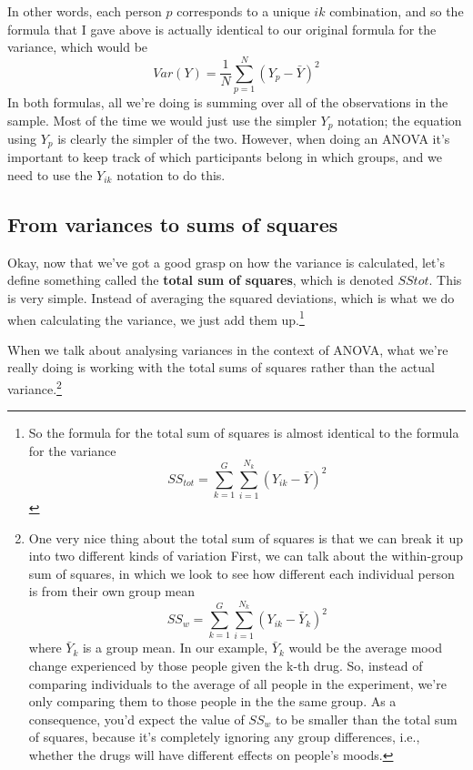 \documentclass[
  a4paper,
]{book}
\begin{document}
In other words, each person \(p\) corresponds to a unique \(ik\)
combination, and so the formula that I gave above is actually identical
to our original formula for the variance, which would be
\[Var(Y)=\frac{1}{N}\sum_{p=1}^{N}(Y_p-\bar{Y})^2\] In both formulas,
all we're doing is summing over all of the observations in the sample.
Most of the time we would just use the simpler \(Y_p\) notation; the
equation using \(Y_p\) is clearly the simpler of the two. However, when
doing an ANOVA it's important to keep track of which participants belong
in which groups, and we need to use the \(Y_{ik}\) notation to do this.

\hypertarget{from-variances-to-sums-of-squares}{%
\subsection{From variances to sums of
squares}\label{from-variances-to-sums-of-squares}}

Okay, now that we've got a good grasp on how the variance is calculated,
let's define something called the \textbf{total sum of squares}, which
is denoted \(SStot\). This is very simple. Instead of averaging the
squared deviations, which is what we do when calculating the variance,
we just add them up.\footnote{So the formula for the total sum of
  squares is almost identical to the formula for the variance
  \[SS_{tot}=\sum_{k=1}^{G} \sum_{i=1}^{N_k} (Y_{ik} - \bar{Y})^2\]}

When we talk about analysing variances in the context of ANOVA, what
we're really doing is working with the total sums of squares rather than
the actual variance.\footnote{One very nice thing about the total sum of
  squares is that we can break it up into two different kinds of
  variation First, we can talk about the within-group sum of squares, in
  which we look to see how different each individual person is from
  their own group mean
  \[SS_{w}= \sum_{k=1}^{G} \sum_{i=1}^{N_k} (Y_{ik} - \bar{Y}_k)^2\]
  where \(\bar{Y}_k\) is a group mean. In our example, \(\bar{Y}_k\)
  would be the average mood change experienced by those people given the
  k-th drug. So, instead of comparing individuals to the average of all
  people in the experiment, we're only comparing them to those people in
  the the same group. As a consequence, you'd expect the value of
  \(SS_w\) to be smaller than the total sum of squares, because it's
  completely ignoring any group differences, i.e., whether the drugs
  will have different effects on people's moods.}
\end{document}
